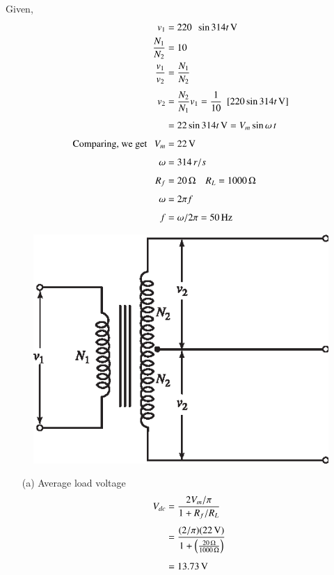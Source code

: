 \begin{solution}
Given,
\begin{align*}
v_1 & = 220 ~~ \sin 314 t\operatorname{\mathrm{V}}\\
\frac{N_1}{N_2} & = 10\\
\frac{v_1}{v_2} & = \frac{N_1 }{N_2}\\[4pt]
v_2 & = \frac{N_2}{N_1} v_1 = \frac{1}{10} \ \ [220 \sin 314 t \operatorname{\mathrm{V}}]\\[4pt]
& = 22 \sin 314 t \operatorname{\mathrm{V}} = V_m \sin \omega\, t \\[4pt]
\text{Comparing, we get } ~~ V_{m} & = 22 \operatorname{\mathrm{V}} \\[4pt]
\omega & = 314\, r/s\\[4pt]
R_f & = 20\, \Omega \quad R_L = 1000\,\Omega\\[4pt]
\omega & = 2 \pi f\\[4pt]
f & = \omega/ 2 \pi = 50 \operatorname{Hz}
\end{align*}
\begin{figure}[H]
\centering
\includegraphics{chap2/add-fig/S3-EE-02-IN006.eps}
\end{figure}

\begin{itemize}
\item[(a)] Average load voltage
\begin{align*}
V_{dc} & = \frac{2V_m/\pi}{1 + R_f / R_L}\\[4pt]
& = \frac{(2/\pi) (22 \operatorname{\mathrm{V}})}{1+ \left(\frac{20\,\Omega}{1000\,\Omega}
  \right)}\\[4pt]
& = 13.73 \operatorname{\mathrm{V}}
\end{align*}


\end{itemize}
\end{solution}
